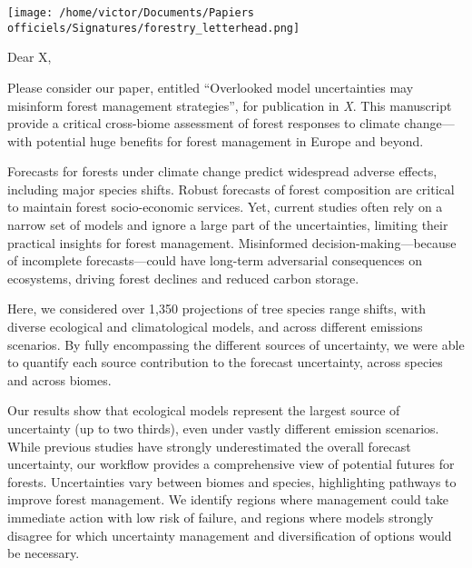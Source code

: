 \documentclass[11pt,a4paper]{article}
\begin{document}

\noindent \texttt{[image: /home/victor/Documents/Papiers officiels/Signatures/forestry\_letterhead.png]}

\vspace{0.75cm}

\noindent Dear X, %

\vspace{0.25cm} %

\noindent Please consider our paper, entitled ``Overlooked model uncertainties may misinform forest management strategies'', for publication in \emph{X}. This manuscript provide a critical cross-biome assessment of forest responses to climate change---with potential huge benefits for forest management in Europe and beyond.

\vspace{0.3cm}

\noindent Forecasts for forests under climate change predict widespread adverse effects, including major species shifts. Robust forecasts of forest composition are critical to maintain forest socio-economic services. Yet, current studies often rely on a narrow set of models and ignore a large part of the uncertainties\supercite{Wessely2024, Hanewinkel2013}, limiting their practical insights for forest management. Misinformed decision-making---because of incomplete forecasts---could have long-term adversarial consequences on ecosystems\supercite{Dawson2011, Urban2016}, driving forest declines and reduced carbon storage.

\vspace{0.3cm}
\noindent Here, we considered over 1,350 projections of tree species range shifts, with diverse ecological and climatological models, and across different emissions scenarios. By fully encompassing the different sources of uncertainty, we were able to quantify each source contribution to the forecast uncertainty, across species and across biomes.
\vspace{0.3cm}

\noindent Our results show that ecological models represent the largest source of uncertainty (up to two thirds), even under vastly different emission scenarios. While previous studies have strongly underestimated the overall forecast uncertainty, our workflow provides a comprehensive view of potential futures for forests. Uncertainties vary between biomes and species, highlighting pathways to improve forest management. We identify regions where management could take immediate action with low risk of failure, and regions where models strongly disagree for which uncertainty management and diversification of options would be necessary.
\end{document}
